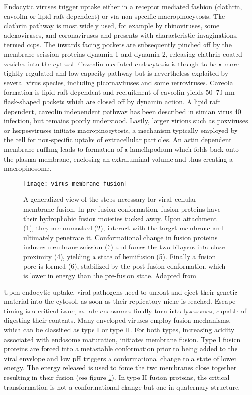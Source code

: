 Endocytic viruses trigger uptake either in a receptor mediated fashion (clathrin, caveolin or lipid raft dependent) or via non-specific macropinocytosis. The clathrin pathway is most widely used, for example by rhinoviruses, some adenoviruses, and coronaviruses and presents with characteristic invaginations, termed \glspl{ccp}. The inwards facing pockets are subsequently pinched off by the membrane scission proteins dynamin-1 and dynamin-2, releasing clathrin-coated vesicles into the cytosol. Caveolin-mediated endocytosis is though to be a more tightly regulated and low capacity pathway but is nevertheless exploited by several virus species, including picornaviruses and some retroviruses. Caveola formation is lipid raft dependent and recruitment of caveolin yields 50--70 nm flask-shaped pockets which are closed off by dynamin action. A lipid raft dependent, caveolin independent pathway has been described in simian virus 40 infection, but remains poorly understood. Lastly, larger virions such as poxviruses or herpesviruses initiate macropinocytosis, a mechanism typically employed by the cell for non-specific uptake of extracellular particles. An actin dependent membrane ruffling leads to formation of a lamellipodium which folds back onto the plasma membrane, enclosing an extraluminal volume and thus creating a macropinosome.

\begin{figure}
  \centering
  \texttt{[image: virus-membrane-fusion]}
  \caption[A generalized view of the steps necessary for viral--cellular membrane fusion]{A generalized view of the steps necessary for viral--cellular membrane fusion. In pre-fusion conformation, fusion proteins have their hydrophobic fusion moieties tucked away. Upon attachment (1), they are unmasked (2), interact with the target membrane and ultimately penetrate it. Conformational change in fusion proteins induces membrane scission (3) and forces the two bilayers into close proximity (4), yielding a state of hemifusion (5). Finally a fusion pore is formed (6), stabilized by the post-fusion conformation which is lower in energy than the pre-fusion state. Adapted from \cite{Hulo2011}}
  \label{fig:virus-membrane-fusion}
\end{figure}

Upon endocytic uptake, viral pathogens need to uncoat and eject their genetic material into the cytosol, as soon as their replicatory niche is reached. Escape timing is a critical issue, as late endosomes finally turn into lysosomes, capable of digesting their contents. Many enveloped viruses employ fusion mechanisms, which can be classified as type I or type II. For both types, increasing acidity associated with endosome maturation, initiates membrane fusion. Type I fusion proteins are forced into a metastable conformation prior to being added to the viral envelope and low pH triggers a conformational change to a state of lower energy. The energy released is used to force the two membranes close together resulting in their fusion (see figure \ref{fig:virus-membrane-fusion}). In type II fusion proteins, the critical transformation is not a conformational change but one in quaternary structure.

